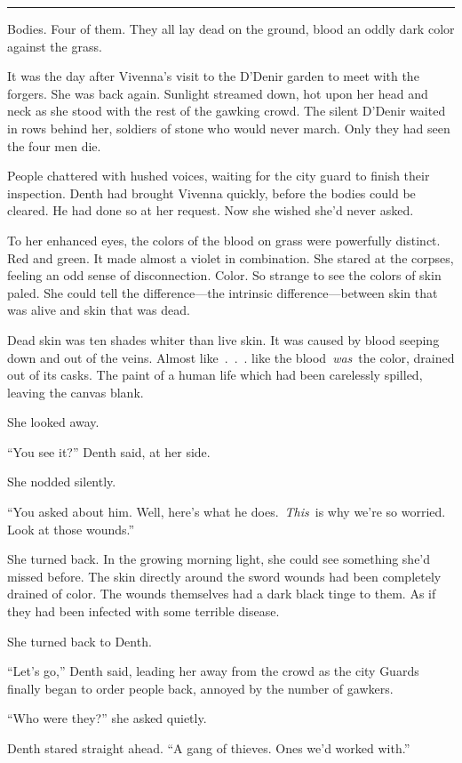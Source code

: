 \bigskip \hrule \bigskip

Bodies. Four of them. They all lay dead on the ground, blood an oddly dark color against the grass.

It was the day after Vivenna’s visit to the D’Denir garden to meet with the forgers. She was back again. Sunlight streamed down, hot upon her head and neck as she stood with the rest of the gawking crowd. The silent D’Denir waited in rows behind her, soldiers of stone who would never march. Only they had seen the four men die.

People chattered with hushed voices, waiting for the city guard to finish their inspection. Denth had brought Vivenna quickly, before the bodies could be cleared. He had done so at her request. Now she wished she’d never asked.

To her enhanced eyes, the colors of the blood on grass were powerfully distinct. Red and green. It made almost a violet in combination. She stared at the corpses, feeling an odd sense of disconnection. Color. So strange to see the colors of skin paled. She could tell the difference—the intrinsic difference—between skin that was alive and skin that was dead.

Dead skin was ten shades whiter than live skin. It was caused by blood seeping down and out of the veins. Almost like~.~.~. like the blood~\textit{was}~the color, drained out of its casks. The paint of a human life which had been carelessly spilled, leaving the canvas blank.

She looked away.

“You see it?” Denth said, at her side.

She nodded silently.

“You asked about him. Well, here’s what he does.~\textit{This}~is why we’re so worried. Look at those wounds.”

She turned back. In the growing morning light, she could see something she’d missed before. The skin directly around the sword wounds had been completely drained of color. The wounds themselves had a dark black tinge to them. As if they had been infected with some terrible disease.

She turned back to Denth.

“Let’s go,” Denth said, leading her away from the crowd as the city Guards finally began to order people back, annoyed by the number of gawkers.

“Who were they?” she asked quietly.

Denth stared straight ahead. “A gang of thieves. Ones we’d worked with.”

